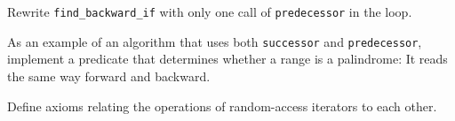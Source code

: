 \begin{exercise}
	Rewrite \verb|find_backward_if| with only one call of \verb|predecessor| in the loop.
\end{exercise}



\begin{exercise}
	As an example of an algorithm that uses both \verb|successor| and \verb|predecessor|,
	implement a predicate that determines whether a range is a palindrome: It reads the
	same way forward and backward.
\end{exercise}



\begin{project}
	Define axioms relating the operations of random-access iterators to each other.
\end{project}
